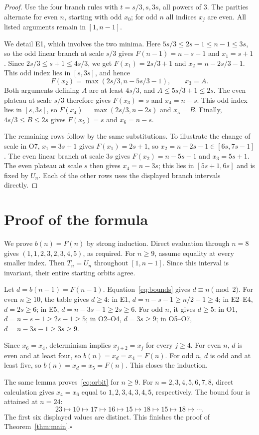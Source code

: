 \documentclass[10pt,a4paper]{article}
\begin{document}
\begin{proof}
Use the four branch rules with $t=s/3,s,3s$, all powers of $3$. The
parities alternate for even $n$, starting with odd $x_0$; for odd $n$
all indices $x_j$ are even. All listed arguments remain in $[1,n-1]$.

We detail E1, which involves the two minima. Here
$5s/3\le2s-1\le n-1\le3s$, so the odd linear branch at scale $s/3$
gives $F(n-1)=n-s-1$ and $x_1=s+1$. Since
$2s/3\le s+1\le4s/3$, we get $F(x_1)=2s/3+1$ and
$x_2=n-2s/3-1$. This odd index lies in $[s,3s]$, and hence
\[
F(x_2)=\max(2s/3,n-5s/3-1),\qquad x_3=A.
\]
Both arguments defining $A$ are at least $4s/3$, and
$A\le5s/3+1\le2s$. The even plateau at scale $s/3$ therefore gives
$F(x_3)=s$ and $x_4=n-s$. This odd index lies in $[s,3s]$, so
$F(x_4)=\max(2s/3,n-2s)$ and $x_5=B$. Finally,
$4s/3\le B\le2s$ gives $F(x_5)=s$ and $x_6=n-s$.

The remaining rows follow by the same substitutions. To illustrate the
change of scale in O7, $x_1=3s+1$ gives $F(x_1)=2s+1$, so
$x_2=n-2s-1\in[6s,7s-1]$. The even linear branch at scale $3s$
gives $F(x_2)=n-5s-1$ and $x_3=5s+1$. The even plateau at scale $s$
then gives $x_4=n-3s$; this lies in $[5s+1,6s]$ and is fixed by $U_n$.
Each of the other rows uses the displayed branch intervals directly.
\end{proof}

\section{Proof of the formula}
We prove $b(n)=F(n)$ by strong induction. Direct evaluation through $n=8$
gives $(1,1,2,3,2,3,4,5)$, as required. For $n\ge9$, assume equality
at every smaller index. Then $T_n=U_n$ throughout $[1,n-1]$. Since this
interval is invariant, their entire starting orbits agree.

Let $d=b(n-1)=F(n-1)$. Equation~\eqref{eq:bounds} gives
$d\equiv n\pmod2$. For even $n\ge10$, the table gives $d\ge4$:
in E1, $d=n-s-1\ge n/2-1\ge4$; in E2--E4, $d=2s\ge6$;
in E5, $d=n-3s-1\ge2s\ge6$. For odd $n$, it gives $d\ge5$:
in O1, $d=n-s-1\ge2s-1\ge5$; in O2--O4, $d=3s\ge9$;
in O5--O7, $d=n-3s-1\ge3s\ge9$.

Since $x_6=x_4$, determinism implies $x_{j+2}=x_j$ for every $j\ge4$.
For even $n$, $d$ is even and at least four, so
$b(n)=x_d=x_4=F(n)$. For odd $n$, $d$ is odd and at least five, so
$b(n)=x_d=x_5=F(n)$. This closes the induction.

The same lemma proves~\eqref{eq:orbit} for $n\ge9$. For
$n=2,3,4,5,6,7,8$, direct calculation gives $x_4=x_6$ equal to
$1,2,3,4,3,4,5$, respectively. The bound four is attained at $n=24$:
\[
23\longmapsto10\longmapsto17\longmapsto16\longmapsto15
\longmapsto18\longmapsto15\longmapsto18\longmapsto\cdots.
\]
The first six displayed values are distinct. This finishes the proof of
Theorem~\ref{thm:main}.\hfill$\square$
\end{document}
